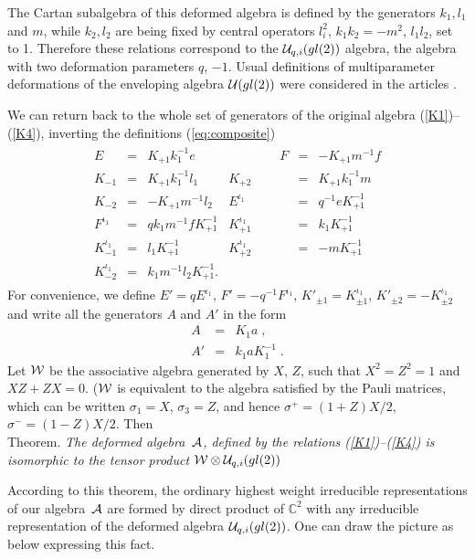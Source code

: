 \documentclass[a4paper,a4paper]{article}
\def\cA{{\cal A}}          \def\cB{{\cal B}}          \def\cC{{\cal C}}
\def\CC{{\mathbb C}}
\begin{document}
The Cartan subalgebra of this deformed algebra is defined by the 
generators $k_1, l_1$ and $m$, while $k_2, l_2$ are being
fixed by central operators  $l_i^2$, $k_1 k_2 = -m^2$, $l_1l_2$, 
set to 1.
Therefore these relations correspond to the ${\cal U}_{q,i}(gl(2))$ algebra, the
algebra with two deformation parameters $q$, $-1$. 
Usual definitions of multiparameter
deformations of the enveloping algebra ${\cal U}(gl(2))$ were considered in
the articles \cite{RD}.


We can return back to the whole set of generators of the original
algebra (\ref{K1})--(\ref{K4}), inverting the  definitions
(\ref{eq:composite}) 
\begin{eqnarray}
  \begin{array}{rclrcl}
  E &=& K_{+1}    k_1^{-1}  e   & \qquad\qquad
  F &=& - K_{+1}    m^{-1}  f  \\[1.5mm]
  K_{-1} &=& K_{+1}    k_1^{-1}  l_1  &
  K_{+2} &=& K_{+1}    k_1^{-1}  m  \\[1.5mm]
  K_{-2} &=& - K_{+1}    m^{-1}  l_2  &
  E^{\iota_1} &=&  q^{-1} e    K^{-1}_{+1}   \\[1.5mm]
  F^{\iota_1} &=&  q k_1  m^{-1}  f    K^{-1}_{+1}   &
  K_{+1}^{\iota_1} &=& k_1    K^{-1}_{+1}   \\[1.5mm]
  K_{-1}^{\iota_1} &=& l_1    K^{-1}_{+1}   &
  K_{+2}^{\iota_1} &=& - m    K^{-1}_{+1}   \\[1.5mm]
  K_{-2}^{\iota_1} &=& k_1  m^{-1}  l_2   K^{-1}_{+1}. 
  \end{array}
\end{eqnarray}
For convenience, we define 
$E'= q E^{\iota_1}$,
$F'= - q^{-1} F^{\iota_1}$,
$K'_{\pm 1}= K_{\pm 1}^{\iota_1}$,
$K'_{\pm 2}= - K_{\pm 2}^{\iota_1}$
and write all the generators $A$ and $A'$ in the form
\begin{eqnarray}
  A &=& K_1 a \;, \nonumber\\
  A' &=& k_1 a K_1^{-1} \;.
\end{eqnarray}
Let ${\cal W}$ be the associative algebra generated by $X$, $Z$, such that
$X^2=Z^2=1$ and $XZ+ZX=0$. (${\cal W}$ is equivalent to the algebra
satisfied by the Pauli matrices, which can be written $\sigma_1=X$,
$\sigma_3=Z$, and hence $\sigma^+=(1+Z)X/2$, $\sigma^-=(1-Z)X/2$. Then
\medskip
\\
\noindent
{\large \sc Theorem.} 
\textsl{The deformed algebra~$\cA$, defined by the relations
(\ref{K1})--(\ref{K4}) is isomorphic to  the tensor product
${\cal W} \otimes {\cal U}_{q,i}(gl(2))$
}
\medskip

According to this theorem, the ordinary highest weight 
irreducible representations of our
algebra~$\cA$ are formed by direct product of $\CC^2$ 
with any irreducible representation 
of the deformed algebra ${\cal U}_{q,i}(gl(2))$. One can draw the picture
as below expressing this fact. 
\end{document}
